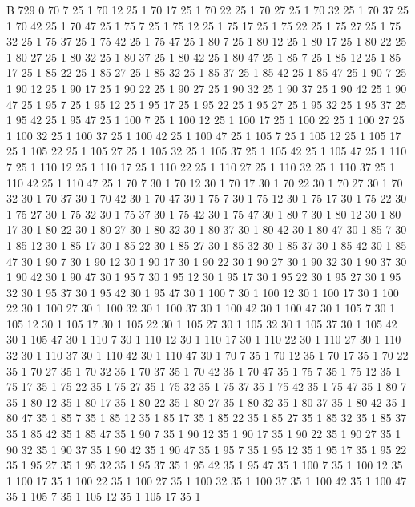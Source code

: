 
 

B	729	0   
70 7 25 1
70 12 25 1
70 17 25 1
70 22 25 1
70 27 25 1
70 32 25 1
70 37 25 1
70 42 25 1
70 47 25 1
75 7 25 1
75 12 25 1
75 17 25 1
75 22 25 1
75 27 25 1
75 32 25 1
75 37 25 1
75 42 25 1
75 47 25 1
80 7 25 1
80 12 25 1
80 17 25 1
80 22 25 1
80 27 25 1
80 32 25 1
80 37 25 1
80 42 25 1
80 47 25 1
85 7 25 1
85 12 25 1
85 17 25 1
85 22 25 1
85 27 25 1
85 32 25 1
85 37 25 1
85 42 25 1
85 47 25 1
90 7 25 1
90 12 25 1
90 17 25 1
90 22 25 1
90 27 25 1
90 32 25 1
90 37 25 1
90 42 25 1
90 47 25 1
95 7 25 1
95 12 25 1
95 17 25 1
95 22 25 1
95 27 25 1
95 32 25 1
95 37 25 1
95 42 25 1
95 47 25 1
100 7 25 1
100 12 25 1
100 17 25 1
100 22 25 1
100 27 25 1
100 32 25 1
100 37 25 1
100 42 25 1
100 47 25 1
105 7 25 1
105 12 25 1
105 17 25 1
105 22 25 1
105 27 25 1
105 32 25 1
105 37 25 1
105 42 25 1
105 47 25 1
110 7 25 1
110 12 25 1
110 17 25 1
110 22 25 1
110 27 25 1
110 32 25 1
110 37 25 1
110 42 25 1
110 47 25 1
70 7 30 1
70 12 30 1
70 17 30 1
70 22 30 1
70 27 30 1
70 32 30 1
70 37 30 1
70 42 30 1
70 47 30 1
75 7 30 1
75 12 30 1
75 17 30 1
75 22 30 1
75 27 30 1
75 32 30 1
75 37 30 1
75 42 30 1
75 47 30 1
80 7 30 1
80 12 30 1
80 17 30 1
80 22 30 1
80 27 30 1
80 32 30 1
80 37 30 1
80 42 30 1
80 47 30 1
85 7 30 1
85 12 30 1
85 17 30 1
85 22 30 1
85 27 30 1
85 32 30 1
85 37 30 1
85 42 30 1
85 47 30 1
90 7 30 1
90 12 30 1
90 17 30 1
90 22 30 1
90 27 30 1
90 32 30 1
90 37 30 1
90 42 30 1
90 47 30 1
95 7 30 1
95 12 30 1
95 17 30 1
95 22 30 1
95 27 30 1
95 32 30 1
95 37 30 1
95 42 30 1
95 47 30 1
100 7 30 1
100 12 30 1
100 17 30 1
100 22 30 1
100 27 30 1
100 32 30 1
100 37 30 1
100 42 30 1
100 47 30 1
105 7 30 1
105 12 30 1
105 17 30 1
105 22 30 1
105 27 30 1
105 32 30 1
105 37 30 1
105 42 30 1
105 47 30 1
110 7 30 1
110 12 30 1
110 17 30 1
110 22 30 1
110 27 30 1
110 32 30 1
110 37 30 1
110 42 30 1
110 47 30 1
70 7 35 1
70 12 35 1
70 17 35 1
70 22 35 1
70 27 35 1
70 32 35 1
70 37 35 1
70 42 35 1
70 47 35 1
75 7 35 1
75 12 35 1
75 17 35 1
75 22 35 1
75 27 35 1
75 32 35 1
75 37 35 1
75 42 35 1
75 47 35 1
80 7 35 1
80 12 35 1
80 17 35 1
80 22 35 1
80 27 35 1
80 32 35 1
80 37 35 1
80 42 35 1
80 47 35 1
85 7 35 1
85 12 35 1
85 17 35 1
85 22 35 1
85 27 35 1
85 32 35 1
85 37 35 1
85 42 35 1
85 47 35 1
90 7 35 1
90 12 35 1
90 17 35 1
90 22 35 1
90 27 35 1
90 32 35 1
90 37 35 1
90 42 35 1
90 47 35 1
95 7 35 1
95 12 35 1
95 17 35 1
95 22 35 1
95 27 35 1
95 32 35 1
95 37 35 1
95 42 35 1
95 47 35 1
100 7 35 1
100 12 35 1
100 17 35 1
100 22 35 1
100 27 35 1
100 32 35 1
100 37 35 1
100 42 35 1
100 47 35 1
105 7 35 1
105 12 35 1
105 17 35 1
